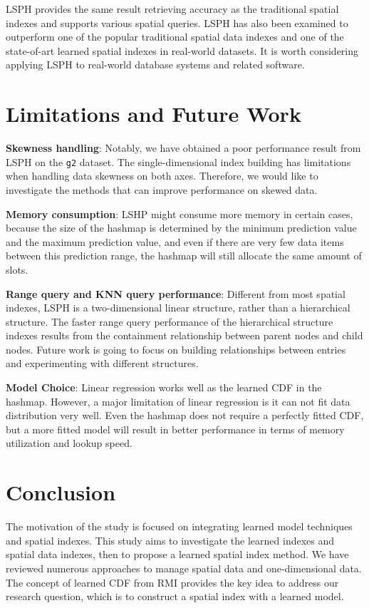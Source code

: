 LSPH provides the same result retrieving accuracy as the traditional spatial indexes and supports various spatial queries. LSPH has also been examined to outperform one of the popular traditional spatial data indexes and one of the state-of-art learned spatial indexes in real-world datasets. It is worth considering applying LSPH to real-world database systems and related software. 


\section{Limitations and Future Work}
\textbf{Skewness handling}: Notably, we have obtained a poor performance result from LSPH on the \texttt{g2} dataset. The single-dimensional index building has limitations when handling data skewness on both axes. Therefore, we would like to investigate the methods that can improve performance on skewed data. 

\textbf{Memory consumption}: LSHP might consume more memory in certain cases, because the size of the hashmap is determined by the minimum prediction value and the maximum prediction value, and even if there are very few data items between this prediction range, the hashmap will still allocate the same amount of slots. 

\textbf{Range query and KNN query performance}: Different from most spatial indexes, LSPH is a two-dimensional linear structure, rather than a hierarchical structure. The faster range query performance of the hierarchical structure indexes results from the containment relationship between parent nodes and child nodes. Future work is going to focus on building relationships between entries and experimenting with different structures. 

\textbf{Model Choice}: Linear regression works well as the learned CDF in the hashmap. However, a major limitation of linear regression is it can not fit data distribution very well. Even the hashmap does not require a perfectly fitted CDF, but a more fitted model will result in better performance in terms of memory utilization and lookup speed. 

\section{Conclusion}
The motivation of the study is focused on integrating learned model techniques and spatial indexes. This study aims to investigate the learned indexes and spatial data indexes, then to propose a learned spatial index method. We have reviewed numerous approaches to manage spatial data and one-dimensional data. The concept of learned CDF from RMI provides the key idea to address our research question, which is to construct a spatial index with a learned model. 

